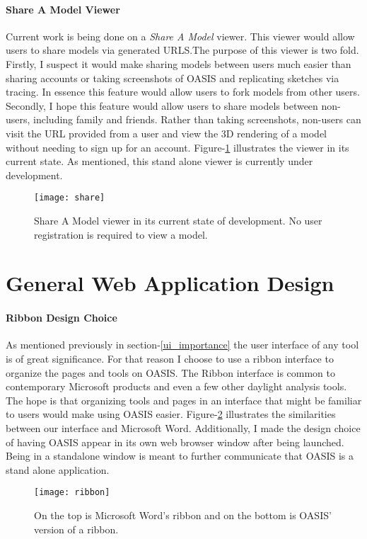 \paragraph{Share A Model Viewer}
Current work is being done on a \textit{Share A Model} viewer. This viewer would allow users to share models via generated URLS.The purpose of this viewer is two fold. Firstly, I suspect it would make sharing models between users much easier than sharing accounts or taking screenshots of OASIS and replicating sketches via tracing. In essence this feature would allow users to fork models from other users. Secondly, I hope this feature would allow users to share models between non-users, including family and friends. Rather than taking screenshots, non-users can visit the URL provided from a user and view the 3D rendering of a model without needing to sign up for an account. Figure-\ref{fig:share} illustrates the viewer in its current state. As mentioned, this stand alone viewer is currently under development.
\begin{figure}[h]
\centering
\texttt{[image: share]}
\caption{Share A Model viewer in its current state of development. No user registration is required to view a model.}
\label{fig:share}
\end{figure}

\section{General Web Application Design}

\paragraph{Ribbon Design Choice} As mentioned previously in section-\ref{ui_importance} the user interface of any tool is of great significance. 
For that reason I choose to use a ribbon interface to organize the pages and tools on OASIS. 
The Ribbon interface is common to contemporary Microsoft products and even a few other daylight analysis tools\cite{todo}.
The hope is that organizing tools and pages in an interface that might be familiar to users would make using OASIS easier. Figure-\ref{fig:ribbon} illustrates the similarities between our interface and Microsoft Word.
Additionally, I made the design choice of having OASIS appear in its own web browser window after being launched. Being in a standalone window is meant to further communicate that OASIS is a stand alone application.


\begin{figure}[h]
\centering
\texttt{[image: ribbon]}
\caption{On the top is Microsoft Word's ribbon and on the bottom is OASIS' version of a ribbon.}
\label{fig:ribbon}
\end{figure}

